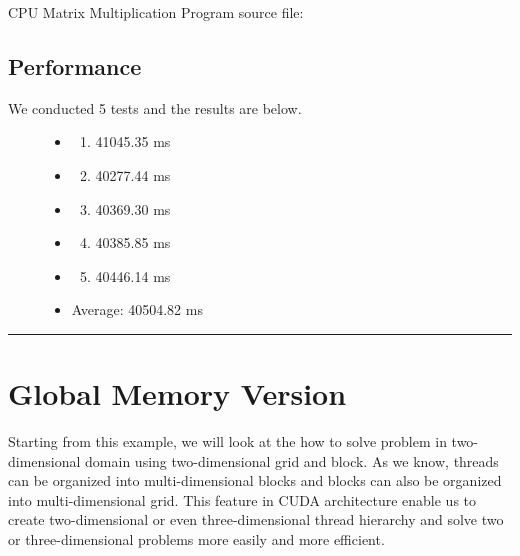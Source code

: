 \documentclass[letterpaper,10pt,english]{sphinxmanual}
\begin{document}
CPU Matrix Multiplication Program source file:


\subsection{Performance}
\label{CUDA2D/CUDA2D:performance}\begin{description}
\item[{We conducted 5 tests and the results are below.}] \leavevmode\begin{itemize}
\item {} \begin{enumerate}
\item {} 
41045.35 ms

\end{enumerate}

\item {} \begin{enumerate}
\setcounter{enumi}{1}
\item {} 
40277.44 ms

\end{enumerate}

\item {} \begin{enumerate}
\setcounter{enumi}{2}
\item {} 
40369.30 ms

\end{enumerate}

\item {} \begin{enumerate}
\setcounter{enumi}{3}
\item {} 
40385.85 ms

\end{enumerate}

\item {} \begin{enumerate}
\setcounter{enumi}{4}
\item {} 
40446.14 ms

\end{enumerate}

\item {} 
Average: 40504.82 ms

\end{itemize}

\end{description}


\bigskip\hrule{}\bigskip



\section{Global Memory Version}
\label{CUDA2D/CUDA2D:global-memory-version}
Starting from this example, we will look at the how to solve problem in two-dimensional domain using two-dimensional grid and block. As we know, threads can be organized into multi-dimensional blocks and blocks can also be organized into multi-dimensional grid. This feature in CUDA architecture enable us to create two-dimensional or even three-dimensional thread hierarchy and solve two or three-dimensional problems more easily and more efficient.
\end{document}
